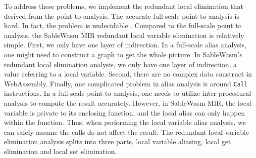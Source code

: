 To address these problems, we implement the redundant local elimination that derived from the point-to analysis\cite{alias-sable, point-to-microsoft, point-to-survey}. The accurate full-scale point-to analysis is hard. In fact, the problem is undecidable \cite{point-to-undecidable}. Compared to the full-scale point to analysis, the SableWasm MIR redundant local variable elimination is relatively simple. First, we only have one layer of indirection. In a full-scale alias analysis, one might need to construct a graph to get the whole picture. In SableWasm's redundant local elimination analysis, we only have one layer of indirection, a value referring to a local variable. Second, there are no complex data construct in WebAssembly. Finally, one complicated problem in alias analysis is around \texttt{Call} instructions. In a full-scale point-to analysis, one needs to utilize inter-procedural analysis to compute the result accurately. However, in SableWasm MIR, the local variable is private to its enclosing function, and the local alias can only happen within the function. Thus, when performing the local variable alias analysis, we can safely assume the calls do not affect the result. The redundant local variable elimination analysis splits into three parts, local variable aliasing, local get elimination and local set elimination.

